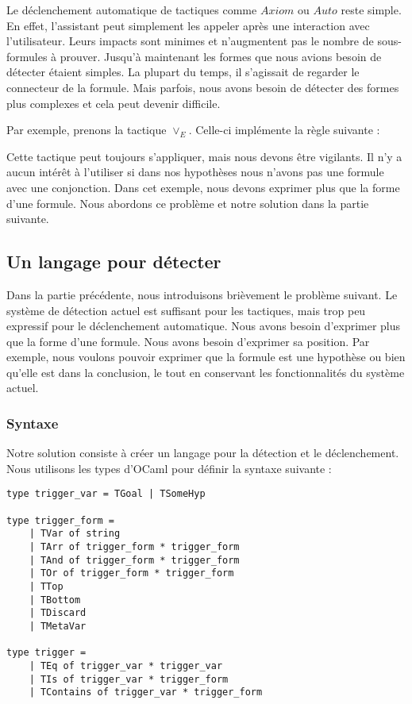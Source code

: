 \documentclass[french,titlepage]{article}
\begin{document}
Le déclenchement automatique de tactiques comme $Axiom$ ou $Auto$ reste simple. En effet, l'assistant peut simplement les appeler après une interaction avec l'utilisateur. Leurs impacts sont minimes et n'augmentent pas le nombre de sous-formules à prouver. Jusqu'à maintenant les formes que nous avions besoin de détecter étaient simples. La plupart du temps, il s'agissait de regarder le connecteur de la formule. Mais parfois, nous avons besoin de détecter des formes plus complexes et cela peut devenir difficile.

Par exemple, prenons la tactique $\lor_E$. Celle-ci implémente la règle suivante :
\begin{mathpar}
\end{mathpar}
Cette tactique peut toujours s'appliquer, mais nous devons être vigilants. Il n'y a aucun intérêt à l'utiliser si dans nos hypothèses nous n'avons pas une formule avec une conjonction. Dans cet exemple, nous devons exprimer plus que la forme d'une formule. Nous abordons ce problème et notre solution dans la partie suivante.

\subsection{Un langage pour détecter} \label{realisation:langage_detecter}
Dans la partie précédente, nous introduisons brièvement le problème suivant. Le système de détection actuel est suffisant pour les tactiques, mais trop peu expressif pour le déclenchement automatique. Nous avons besoin d'exprimer plus que la forme d'une formule. Nous avons besoin d'exprimer sa position. Par exemple, nous voulons pouvoir exprimer que la formule est une hypothèse ou bien qu'elle est dans la conclusion, le tout en conservant les fonctionnalités du système actuel.

\subsubsection{Syntaxe} \label{realisation:langage_detecter:syntaxe}
Notre solution consiste à créer un langage pour la détection et le déclenchement. Nous utilisons les types d'OCaml pour définir la syntaxe suivante :
\begin{verbatim}
type trigger_var = TGoal | TSomeHyp

type trigger_form =
    | TVar of string
    | TArr of trigger_form * trigger_form
    | TAnd of trigger_form * trigger_form
    | TOr of trigger_form * trigger_form
    | TTop
    | TBottom
    | TDiscard
    | TMetaVar

type trigger =
    | TEq of trigger_var * trigger_var
    | TIs of trigger_var * trigger_form
    | TContains of trigger_var * trigger_form
\end{verbatim}
\end{document}
